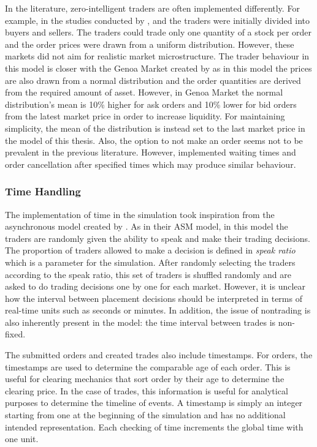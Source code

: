 In the literature, zero-intelligent traders are often implemented differently. For example, in the studies conducted by 
\citet{God93}, \citet{Jam96} and \citet{Mil08} the traders were initially divided into buyers and 
sellers. The traders could trade only one quantity of a stock per order and the order prices 
were drawn from a uniform distribution. However, these markets did not aim for 
realistic market microstructure. The trader behaviour in this model is closer with the Genoa Market 
created by \citet{Genoa01} as in this model the prices are also drawn from a normal distribution and 
the order quantities are derived from the required amount of asset. However, in Genoa Market the 
normal distribution's mean is 10\% higher for ask orders and 10\% lower for bid orders from the 
latest market price in order to increase liquidity. For maintaining simplicity, the mean of the distribution 
is instead set to the last market price in the model of this thesis. Also, the option to not make an order 
seems not to be prevalent in the previous literature. However, \citet{Raberto05} implemented waiting times and order 
cancellation after specified times which may produce similar behaviour. 

\subsubsection{Time Handling}

The implementation of time in the simulation took inspiration from the asynchronous model created by \citet{Julien07}. 
As in their ASM model, in this model the traders are randomly given the ability to speak and make 
their trading decisions. The proportion of traders allowed to make a decision is defined in
\textit{speak ratio} which is a parameter for the simulation. After randomly selecting the traders
according to the speak ratio, this set of traders is shuffled randomly and are asked to do trading 
decisions one by one for each market. However, it is unclear how the interval between placement 
decisions should be interpreted in terms of real-time units such as seconds or minutes. In addition, 
the issue of nontrading is also inherently present in the model: the time interval between trades 
is non-fixed.

The submitted orders and created trades also include timestamps. For orders, the timestamps are used
to determine the comparable age of each order. This is useful for clearing mechanics that sort 
order by their age to determine the clearing price. In the case of trades, this information
is useful for analytical purposes to determine the timeline of events. A timestamp is simply 
an integer starting from one at the beginning of the simulation and has no additional 
intended representation. Each checking of time increments the global time with one unit.

